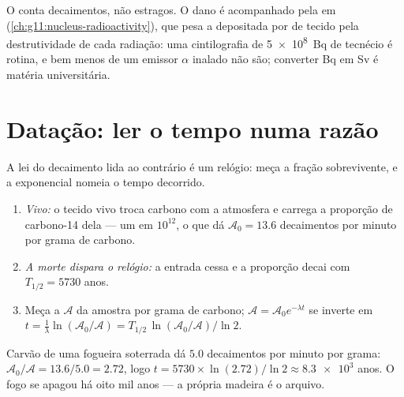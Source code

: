 \begin{remark}\label{rem:g12:radioactive-decay:dose}
O  conta decaimentos, não estragos. O dano é acompanhado pela  em 
(\cref{ch:g11:nucleus-radioactivity}), que pesa a  depositada por  de
tecido pela destrutividade de cada radiação: uma cintilografia de \qty{5e8}{Bq} de
tecnécio é rotina, e bem menos  de um emissor $\alpha$ inalado não são;
converter \unit{Bq} em \unit{Sv} é matéria universitária.
\end{remark}

\section{Datação: ler o tempo numa razão}

A lei do decaimento lida ao contrário é um relógio: meça a fração sobrevivente, e a
exponencial nomeia o tempo decorrido.

\begin{method}\label{met:g12:radioactive-decay:carbon}
\begin{enumerate}
  \item \emph{Vivo:} o tecido vivo troca carbono com a atmosfera e carrega a proporção
        de carbono-14 dela --- um  em $10^{12}$, o que dá
        $\mathcal A_0 = 13.6$ decaimentos por minuto por grama de carbono.
  \item \emph{A morte dispara o relógio:} a entrada cessa e a proporção decai com
        $T_{1/2} = \num{5730}$ anos.
  \item Meça a  $\mathcal A$ da amostra por grama de carbono;
        $\mathcal A = \mathcal A_0 e^{-\lambda t}$ se inverte em
        $t = \frac{1}{\lambda}\ln(\mathcal A_0/\mathcal A)
        = T_{1/2}\,\ln(\mathcal A_0/\mathcal A)/\ln 2$.
\end{enumerate}
\end{method}

\begin{example}\label{ex:g12:radioactive-decay:hearth}
Carvão de uma fogueira soterrada dá $5.0$ decaimentos por minuto por grama:
$\mathcal A_0/\mathcal A = 13.6/5.0 = 2.72$, logo
$t = \num{5730} \times \ln(2.72)/\ln 2 \approx \num{8.3e3}$ anos. O fogo se apagou há
oito mil anos --- a própria madeira é o arquivo.
\end{example}

